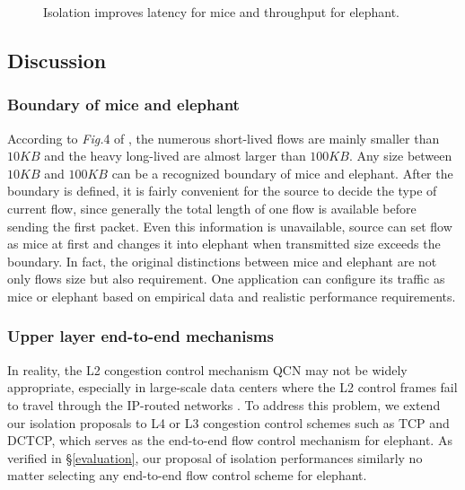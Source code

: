 \documentclass[]{sig-alternate-10pt}
\begin{document}
\begin{figure}[t]
	\centering
	\hfill
	\caption{Isolation improves latency for mice and throughput for elephant. }
	\label{fig:s}
\end{figure}

\subsection{Discussion}
\subsubsection{Boundary of mice and elephant}
According to \emph{Fig.}4 of \cite{alizadeh2011data}, the numerous short-lived flows are mainly smaller than $10KB$ and the heavy long-lived are almost larger than $100KB$. Any size between $10KB$ and $100KB$ can be a recognized boundary of mice and elephant.
After the boundary is defined, it is fairly convenient for the source to decide the type of current flow, since generally the total length of one flow is available before sending the first packet. Even this information is unavailable, source can set flow as mice at first and changes it into elephant when transmitted size exceeds the boundary.
In fact, the original distinctions between mice and elephant are not only flows size but also requirement.
One application can configure its traffic as mice or elephant based on  empirical data and realistic performance requirements.
\subsubsection{Upper layer end-to-end mechanisms}

In reality, the L2 congestion control mechanism QCN may not be widely appropriate, especially in large-scale data centers where the L2 control frames fail to  travel through the IP-routed networks \cite{zhu2015congestion}.
To address this problem, we extend our isolation proposals to  L4 or L3 congestion control schemes such as TCP and DCTCP, which serves as the end-to-end flow control mechanism for elephant. 
As verified in \S\ref{evaluation}, our proposal of isolation performances similarly no matter selecting any end-to-end flow control scheme for elephant.
\end{document}
